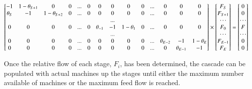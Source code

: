\documentclass{anstrans}
\begin{document}
\begin{strip}
\begin{equation}
\setcounter{MaxMatrixCols}{20}
\begin{bmatrix}
-1         & 1-\theta_{S+1} & 0              & 0 & ... & 0 & 0            & 0   & 0              & 0 & ... & 0            & 0            & 0 \\
\theta_{S} & -1             & 1-\theta_{S+2} & 0 & ... & 0 & 0            & 0   & 0              & 0 & ... & 0            & 0            & 0 \\
           &                &                &   &     &   &              & ... &                &   &     &              &              &   \\
0          & 0              & 0              & 0 & ... & 0 & \theta_{-1}  & -1  & 1 - \theta_{1} & 0 & ... & 0            & 0            & 0 \\
           &                &                &   &     &   &              & ... &                &   &     &              &              &   \\
0          & 0              & 0              & 0 & ... & 0 & 0            & 0   & 0              & 0 & ... & \theta_{E-2} & -1           & 1-\theta_{E} \\
0          & 0              & 0              & 0 & ... & 0 & 0            & 0   & 0              & 0 & ... & 0            & \theta_{E-1} & -1
\end{bmatrix}
\times
\begin{bmatrix}
     F_{S}   \\
     F_{S+1} \\
     \cdots  \\
     F_{0}   \\
    \cdots   \\
    F_{E-1}  \\
    F_{E}
\end{bmatrix}
=
\begin{bmatrix}
     0   \\
     0 \\
     \cdots  \\
     F   \\
    \cdots   \\
    0  \\
    0
\end{bmatrix}
\label{eq:flow}
\end{equation}
\end{strip}
Once the relative flow of each stage, $F_{i}$, has been determined, the
cascade can be populated with actual machines up the stages
until either the maximum number available of machines or the maximum feed
flow is reached.
\end{document}
